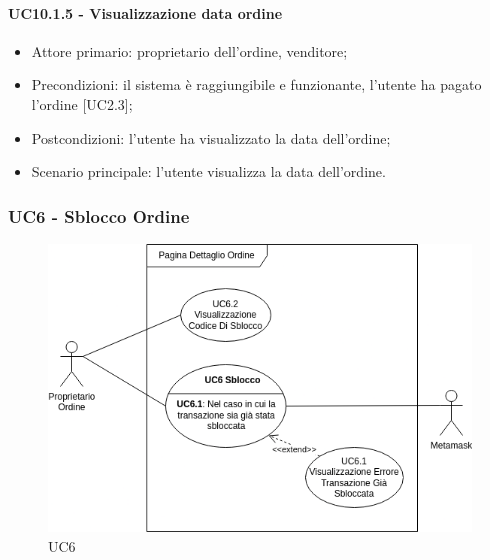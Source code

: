 \paragraph{UC10.1.5 - Visualizzazione data ordine}

\begin{itemize}
    \item Attore primario: proprietario dell'ordine, venditore;
    \item Precondizioni: il sistema è raggiungibile e funzionante, l'utente ha pagato l'ordine [UC2.3];
    \item Postcondizioni: l'utente ha visualizzato la data dell'ordine;
    \item Scenario principale: l'utente visualizza la data dell'ordine.
\end{itemize}

\subsubsection{UC6 - Sblocco Ordine}

\begin{figure}[H]
    \centering
    \includegraphics[scale=0.7]{immagini/UC6.png}
    \caption{UC6}
\end{figure}

